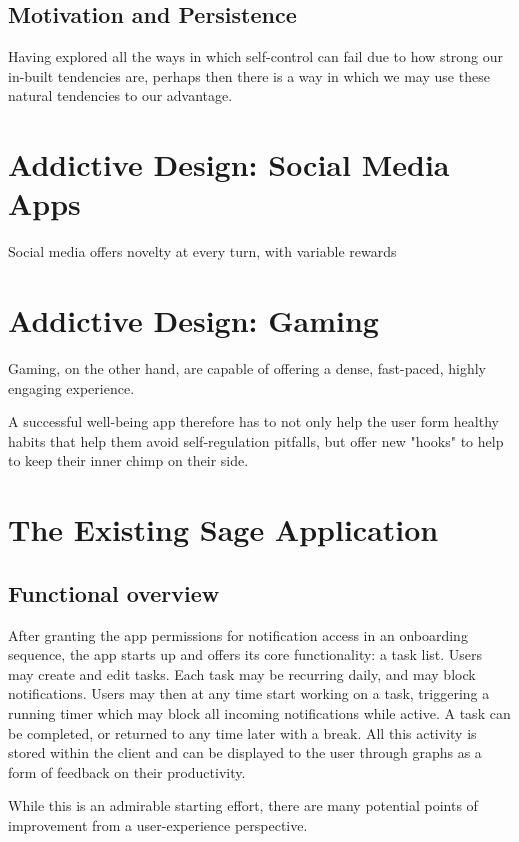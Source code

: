 \subsection{Motivation and Persistence}
Having explored all the ways in which self-control can fail due to how strong our in-built tendencies are, perhaps then there is a way in which we may use these natural tendencies to our advantage.



\section{Addictive Design: Social Media Apps}
Social media offers novelty at every turn, with variable rewards

\section{Addictive Design: Gaming}
Gaming, on the other hand, are capable of offering a dense, fast-paced, highly engaging experience.

A successful well-being app therefore has to not only help the user form healthy habits that help them avoid self-regulation pitfalls, but offer new "hooks" to help to keep their inner chimp on their side.

\section{The Existing Sage Application}
\subsection{Functional overview}
After granting the app permissions for notification access in an onboarding sequence, the app starts up and offers its core functionality: a task list. Users may create and edit tasks. Each task may be recurring daily, and may block notifications. Users may then at any time start working on a task, triggering a running timer which may block all incoming notifications while active. A task can be completed, or returned to any time later with a break. All this activity is stored within the client and can be displayed to the user through graphs as a form of feedback on their productivity.

While this is an admirable starting effort, there are many potential points of improvement from a user-experience perspective.

